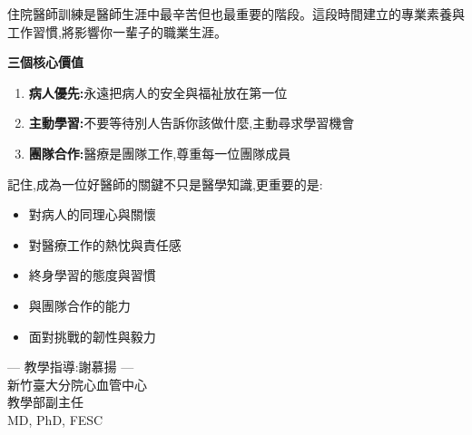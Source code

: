 \documentclass[12pt,a4paper]{article}
\begin{document}
住院醫師訓練是醫師生涯中最辛苦但也最重要的階段。這段時間建立的專業素養與工作習慣,將影響你一輩子的職業生涯。

\begin{importantbox}
\textbf{三個核心價值}
\begin{enumerate}
\item \textbf{病人優先:}永遠把病人的安全與福祉放在第一位
\item \textbf{主動學習:}不要等待別人告訴你該做什麼,主動尋求學習機會
\item \textbf{團隊合作:}醫療是團隊工作,尊重每一位團隊成員
\end{enumerate}
\end{importantbox}

記住,成為一位好醫師的關鍵不只是醫學知識,更重要的是:

\begin{itemize}[leftmargin=*]
\item 對病人的同理心與關懷
\item 對醫療工作的熱忱與責任感
\item 終身學習的態度與習慣
\item 與團隊合作的能力
\item 面對挑戰的韌性與毅力
\end{itemize}


\vspace{2cm}

\begin{center}
\textcolor{emergency_blue}{--- 教學指導:謝慕揚 ---}\\[5pt]
\textcolor{emergency_gray}{新竹臺大分院心血管中心}\\[5pt]
\textcolor{emergency_gray}{教學部副主任}\\[5pt]
\textcolor{emergency_gray}{MD, PhD, FESC}
\end{center}
\end{document}
